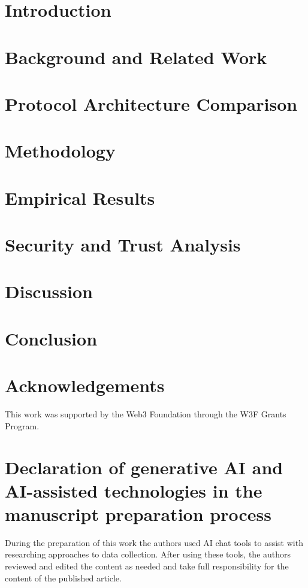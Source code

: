 \documentclass[5p,times,twocolumn,final]{elsarticle}
\begin{document}
\section{Introduction}
\label{sec:introduction}


\section{Background and Related Work}
\label{sec:background}


\section{Protocol Architecture Comparison}
\label{sec:architecture}


\section{Methodology}
\label{sec:methodology}


\section{Empirical Results}
\label{sec:results}


\section{Security and Trust Analysis}
\label{sec:security}


\section{Discussion}
\label{sec:discussion}


\section{Conclusion}
\label{sec:conclusion}


\section*{Acknowledgements}
This work was supported by the Web3 Foundation through the W3F Grants Program.

\section*{Declaration of generative AI and AI-assisted technologies in the manuscript preparation process}
During the preparation of this work the authors used AI chat tools to assist with researching approaches to data collection. After using these tools, the authors reviewed and edited the content as needed and take full responsibility for the content of the published article.



\end{document}
